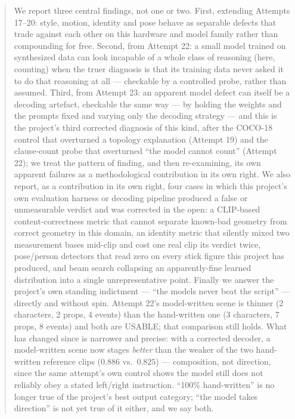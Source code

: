 \documentclass[11pt]{article}
\begin{document}
\begin{abstract}
We report three central findings, not one or two. First, extending
Attempts 17--20: style, motion, identity and pose behave as separable
defects that trade against each other on this hardware and model family
rather than compounding for free. Second, from Attempt 22: a small model
trained on synthesized data can look incapable of a whole class of
reasoning (here, counting) when the truer diagnosis is that its training
data never asked it to do that reasoning at all --- checkable by a
controlled probe, rather than assumed. Third, from Attempt 23: an apparent
model defect can itself be a decoding artefact, checkable the same way ---
by holding the weights and the prompts fixed and varying only the decoding
strategy --- and this is the project's third corrected diagnosis of this
kind, after the COCO-18 control that overturned a topology explanation
(Attempt 19) and the clause-count probe that overturned ``the model cannot
count'' (Attempt 22); we treat the pattern of finding, and then
re-examining, its own apparent failures as a methodological contribution
in its own right. We also report, as a contribution in its own right, four
cases in which this project's own evaluation harness or decoding pipeline
produced a false or unmeasurable verdict and was corrected in the open: a
CLIP-based content-correctness metric that cannot separate known-bad
geometry from correct geometry in this domain, an identity metric that
silently mixed two measurement bases mid-clip and cost one real clip its
verdict twice, pose/person detectors that read zero on every stick figure
this project has produced, and beam search collapsing an apparently-fine
learned distribution into a single unrepresentative point. Finally we
answer the project's own standing indictment --- ``the models never beat
the script'' --- directly and without spin. Attempt 22's model-written
scene is thinner (2 characters, 2 props, 4 events) than the hand-written
one (3 characters, 7 props, 8 events) and both are USABLE; that comparison
still holds. What has changed since is narrower and precise: with a
corrected decoder, a model-written scene now stages \emph{better} than the
weaker of the two hand-written reference clips ($0.886$ vs.\ $0.825$) ---
composition, not direction, since the same attempt's own control shows the
model still does not reliably obey a stated left/right instruction.
``100\% hand-written'' is no longer true of the project's best output
category; ``the model takes direction'' is not yet true of it either, and
we say both.
\end{abstract}
\end{document}
